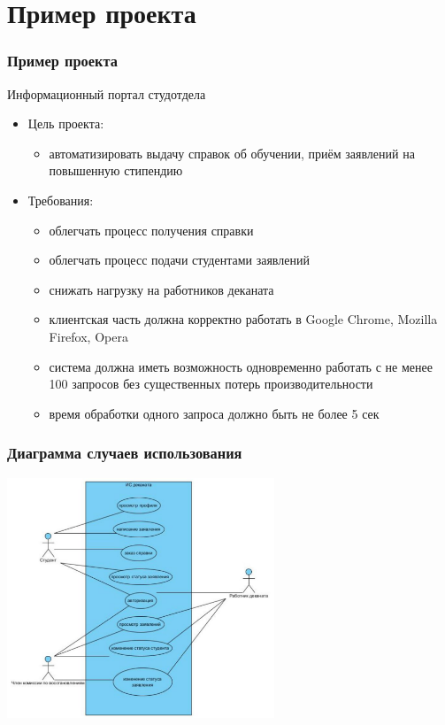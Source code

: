 \documentclass{../../slides-style}
\begin{document}
    \section{Пример проекта}

    \begin{frame}
        \frametitle{Пример проекта}
        Информационный портал студотдела
        \begin{itemize}
            \item Цель проекта:
            \begin{itemize}
                \item автоматизировать выдачу справок об обучении, приём заявлений на повышенную стипендию
            \end{itemize}
            \item Требования:
            \begin{itemize}
                \item облегчать процесс получения справки
                \item облегчать процесс подачи студентами заявлений
                \item снижать нагрузку на работников деканата
                \item клиентская часть должна корректно работать в Google Chrome, Mozilla Firefox, Opera
                \item система должна иметь возможность одновременно работать с не менее 100 запросов без существенных потерь производительности
                \item время обработки одного запроса должно быть не более 5 сек
            \end{itemize}
        \end{itemize}
    \end{frame}

    \begin{frame}
        \frametitle{Диаграмма случаев использования}
        \begin{center}
            \includegraphics[width=0.6\textwidth]{useCase.png}
        \end{center}
    \end{frame}
\end{document}
